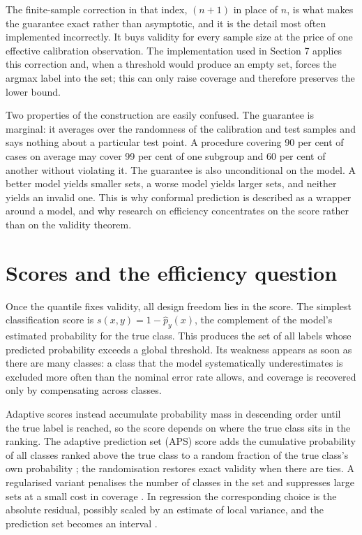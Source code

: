 The finite-sample correction in that index, $(n+1)$ in place of $n$, is what makes
the guarantee exact rather than asymptotic, and it is the detail most often
implemented incorrectly. It buys validity for every sample size at the price of one
effective calibration observation. The implementation used in Section 7 applies
this correction and, when a threshold would produce an empty set, forces the
argmax label into the set; this can only raise coverage and therefore preserves
the lower bound.

Two properties of the construction are easily confused. The guarantee is
marginal: it averages over the randomness of the calibration and test samples and
says nothing about a particular test point. A procedure covering 90 per cent of
cases on average may cover 99 per cent of one subgroup and 60 per cent of another
without violating it. The guarantee is also unconditional on the model. A better
model yields smaller sets, a worse model yields larger sets, and neither yields an
invalid one. This is why conformal prediction is described as a wrapper around a
model, and why research on efficiency concentrates on the score rather than on the
validity theorem.

\section{Scores and the efficiency question}

Once the quantile fixes validity, all design freedom lies in the score. The
simplest classification score is $s(x,y)=1-\hat p_y(x)$, the complement of the
model's estimated probability for the true class. This produces the set of all
labels whose predicted probability exceeds a global threshold. Its weakness
appears as soon as there are many classes: a class that the model systematically
underestimates is excluded more often than the nominal error rate allows, and
coverage is recovered only by compensating across classes.

Adaptive scores instead accumulate probability mass in descending order until the
true label is reached, so the score depends on where the true class sits in the
ranking. The adaptive prediction set (APS) score adds the cumulative probability
of all classes ranked above the true class to a random fraction of the true class's
own probability \cite{Romano2020}; the randomisation restores exact validity when
there are ties. A regularised variant penalises the number of classes in the set
and suppresses large sets at a small cost in coverage \cite{RAPS}. In
regression the corresponding choice is the absolute residual, possibly scaled by
an estimate of local variance, and the prediction set becomes an interval
\cite{Lei2018}.

